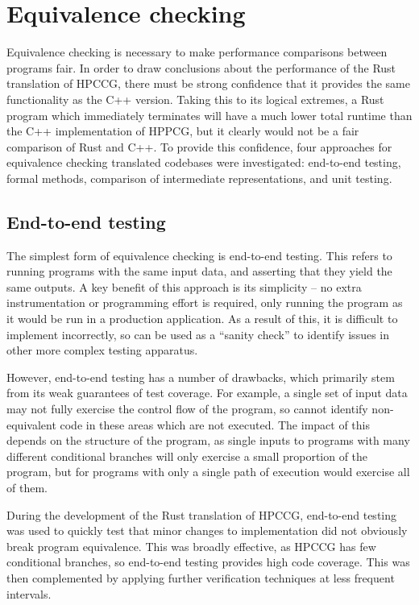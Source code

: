 \section{Equivalence checking}
\label{sec:equivalence-checking}

Equivalence checking is necessary to make performance comparisons between programs fair. In order to draw conclusions about the performance of the Rust translation of HPCCG, there must be strong confidence that it provides the same functionality as the C++ version. Taking this to its logical extremes, a Rust program which immediately terminates will have a much lower total runtime than the C++ implementation of HPPCG, but it clearly would not be a fair comparison of Rust and C++.
To provide this confidence, four approaches for equivalence checking translated codebases were investigated: end-to-end testing, formal methods, comparison of intermediate representations, and unit testing.

\subsection{End-to-end testing}
\label{ssec:equivalence-end-to-end}

The simplest form of equivalence checking is end-to-end testing. This refers to running programs with the same input data, and asserting that they yield the same outputs. A key benefit of this approach is its simplicity -- no extra instrumentation or programming effort is required, only running the program as it would be run in a production application. As a result of this, it is difficult to implement incorrectly, so can be used as a ``sanity check'' to identify issues in other more complex testing apparatus.

However, end-to-end testing has a number of drawbacks, which primarily stem from its weak guarantees of test coverage. For example, a single set of input data may not fully exercise the control flow of the program, so cannot identify non-equivalent code in these areas which are not executed. The impact of this depends on the structure of the program, as single inputs to programs with many different conditional branches will only exercise a small proportion of the program, but for programs with only a single path of execution would exercise all of them.

During the development of the Rust translation of HPCCG, end-to-end testing was used to quickly test that minor changes to implementation did not obviously break program equivalence. This was broadly effective, as HPCCG has few conditional branches, so end-to-end testing provides high code coverage. This was then complemented by applying further verification techniques at less frequent intervals.

